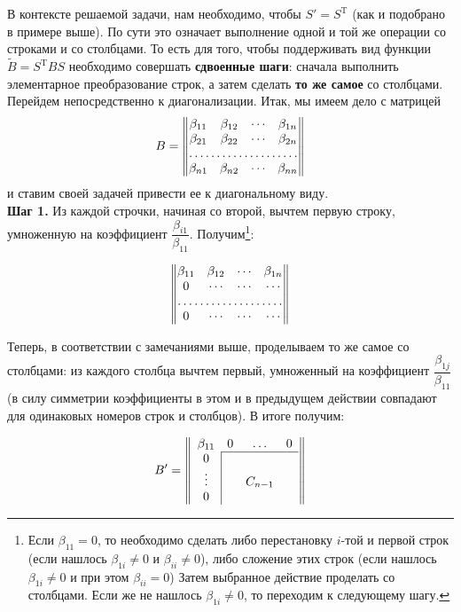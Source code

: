 В контексте решаемой задачи, нам необходимо, чтобы $S'=S^{\text{T}}$ (как и подобрано в примере выше). По сути это означает выполнение одной и той же операции со строками и со столбцами. То есть для того, чтобы поддерживать вид функции $\widetilde B=S^{\text{T}}BS$ необходимо совершать \textbf{сдвоенные шаги}: сначала выполнить элементарное преобразование строк, а затем сделать \textbf{то же самое} со столбцами. \\

Перейдем непосредственно к диагонализации. Итак, мы имеем дело с матрицей $$B=\begin{Vmatrix}
\beta_{11} & \beta_{12} & \cdots & \beta_{1n}\\
\beta_{21} & \beta_{22} & \cdots & \beta_{2n}\\
\hdotsfor{4}\\
\beta_{n1} & \beta_{n2} & \cdots & \beta_{nn}
\end{Vmatrix}$$ и ставим своей задачей привести ее к диагональному виду.\\

\textbf{Шаг 1.} Из каждой строчки, начиная со второй, вычтем первую строку, умноженную на коэффициент $\dfrac{\beta_{i1}}{\beta_{11}}$. Получим\footnote{Если $\beta_{11}=0$, то необходимо сделать либо перестановку $i$-той и первой строк (если нашлось $\beta_{1i}\neq0$ и $\beta_{ii}\neq0$), либо сложение этих строк (если нашлось $\beta_{1i}\neq0$ и при этом $\beta_{ii}=0$) Затем выбранное действие проделать со столбцами. Если же не нашлось $\beta_{1i}\neq0$, то переходим к следующему шагу.}:

$$\begin{Vmatrix}
\beta_{11} & \beta_{12} & \cdots & \beta_{1n}\\
0 & \cdots & \cdots & \cdots\\
\hdotsfor{4} \\
0& \cdots & \cdots & \cdots
\end{Vmatrix}$$

Теперь, в соответствии с замечаниями выше, проделываем то же самое со столбцами: из каждого столбца вычтем первый, умноженный на коэффициент $\dfrac{\beta_{1j}}{\beta_{11}}$ (в силу симметрии коэффициенты в этом и в предыдущем действии совпадают для одинаковых номеров строк и столбцов). В итоге получим:

$$ B' =\left\Vert  \begin{array}{cccc}
\beta_{11} & 0 & \ldots & 0\\
\cline{2-4}  0   & \multicolumn{1}{|c}{} &  &  \\
\vdots & \multicolumn{1}{|c}{} & C_{n-1} & \\
0 & \multicolumn{1}{|c}{} &  & 
\end{array} \right\Vert$$

